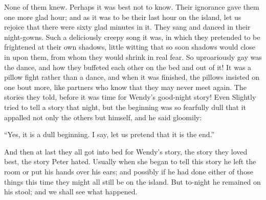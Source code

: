 None of them knew. Perhaps it was best not to know. Their ignorance
gave them one more glad hour; and as it was to be their last hour on
the island, let us rejoice that there were sixty glad minutes in it.
They sang and danced in their night-gowns. Such a deliciously creepy
song it was, in which they pretended to be frightened at their own
shadows, little witting that so soon shadows would close in upon them,
from whom they would shrink in real fear. So uproariously gay was the
dance, and how they buffeted each other on the bed and out of it! It
was a pillow fight rather than a dance, and when it was finished, the
pillows insisted on one bout more, like partners who know that they may
never meet again. The stories they told, before it was time for Wendy's
good-night story! Even Slightly tried to tell a story that night, but
the beginning was so fearfully dull that it appalled not only the
others but himself, and he said gloomily:

``Yes, it is a dull beginning. I say, let us pretend that it is the
end.''

And then at last they all got into bed for Wendy's story, the story
they loved best, the story Peter hated. Usually when she began to tell
this story he left the room or put his hands over his ears; and
possibly if he had done either of those things this time they might all
still be on the island. But to-night he remained on his stool; and we
shall see what happened.
